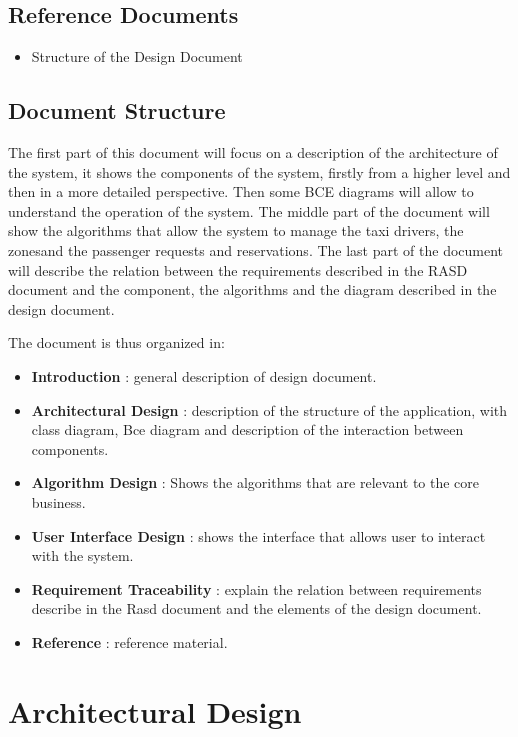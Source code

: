 \documentclass[11pt, a4paper,titlepage]{article}
\begin{document}
\subsection{Reference Documents}
	\begin{itemize}
		\item Structure of the Design Document
	\end{itemize}
\subsection{Document Structure}
The first part of this document will focus on a description of the architecture of the system, it shows the components of the system, firstly from a higher level and then in a more detailed perspective. Then some BCE diagrams will allow to understand the operation of the system.
The middle part of the document will show the algorithms that allow the system to manage the taxi drivers, the zonesand the passenger requests and reservations.
The last part of the document will describe the relation between the requirements described in the RASD document and the component, the algorithms and the diagram described in the design document.

The document is thus organized in:
\begin{itemize}
	\item \textbf{Introduction} : general description of design document.
	\item \textbf{Architectural Design} : description of the structure of the application, with class diagram, Bce diagram and description of the interaction between components.
	\item \textbf{Algorithm Design} : Shows the algorithms that are relevant to the core business.
	\item \textbf{ User Interface Design} : shows the interface that allows user to interact with the system.
	\item \textbf{Requirement Traceability} : explain the relation between requirements describe in the Rasd document and the elements of the design document.
	\item \textbf{Reference} : reference material.
\end{itemize}



\section{Architectural Design}
\end{document}
